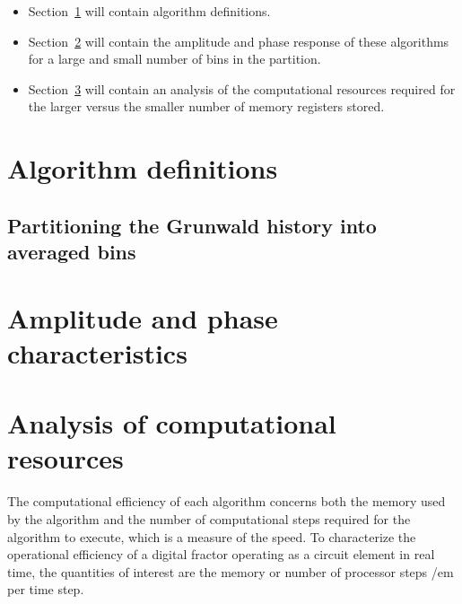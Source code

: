 \documentclass[twoside,reqno,11pt]{fcaa}
\begin{document}
\begin{itemize} 
\item Section~\ref{sec:algorithmDefn} will contain algorithm definitions. 
\item Section~\ref{sec:bode} will contain the amplitude and phase response
  of these algorithms for a large and small number of bins in the
  partition.
\item Section~\ref{sec:computation} will contain an analysis of the
  computational resources required for the larger versus the smaller
  number of memory registers stored.
\end{itemize}


\section{Algorithm definitions}\label{sec:algorithmDefn}
\setcounter{section}{2}
\setcounter{equation}{0}

\vspace{-12pt}
\subsection{Partitioning the Grunwald history into averaged bins}\label{subsec:avgShift}



\section{Amplitude and phase characteristics}\label{sec:bode}
\setcounter{section}{3}
\setcounter{equation}{0}


\section{Analysis of computational resources}\label{sec:computation}
\setcounter{section}{4}
\setcounter{equation}{0}

The computational efficiency of each algorithm concerns both the
memory used by the algorithm and the number of computational steps
required for the algorithm to execute, which is a measure of the
speed. To characterize the operational efficiency of a digital fractor
operating as a circuit element in real time, the quantities of
interest are the memory or number of processor steps {/em per time
  step}.
\end{document}
